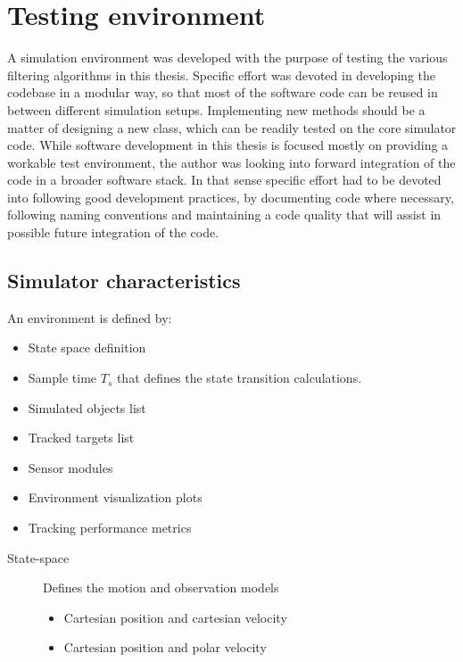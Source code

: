 
\chapter{Testing environment }

A simulation environment was developed with the purpose of testing the various filtering algorithms in this thesis. Specific effort was devoted in developing the codebase in a modular way, so that most of the software code can be reused in between different simulation setups. Implementing new methods should be a matter of designing a new class, which can be readily tested on the core simulator code. While software development in this thesis is focused mostly on providing a workable test environment, the author was looking into forward integration of the code in a broader software stack. In that sense specific effort had to be devoted into following good development practices, by documenting code where necessary, following naming conventions and maintaining a code quality that will assist in possible future integration of the code.


\section{Simulator characteristics}

An environment is defined by:
\begin{itemize}
	\item State space definition 
	\item Sample time $T_s$ that defines the state transition calculations.
	\item Simulated objects list
	\item Tracked targets list
	\item Sensor modules
	\item Environment visualization plots
	\item Tracking performance metrics
\end{itemize}


\begin{description}
	\item[State-space] Defines the motion and observation models
	\begin{itemize}
		\item Cartesian position and cartesian velocity
		\item Cartesian position and polar velocity
	\end{itemize}
\end{description}

